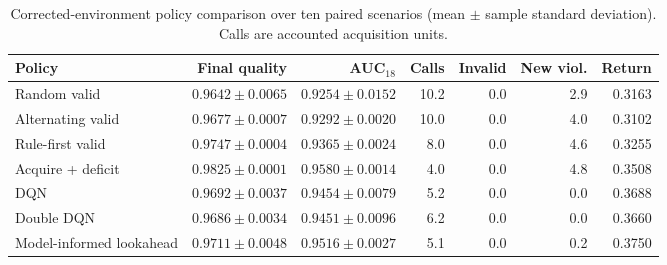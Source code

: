 \begin{table}[t]
\centering
\caption{Corrected-environment policy comparison over ten paired scenarios (mean $\pm$ sample standard deviation). Calls are accounted acquisition units.}
\label{tab:rl_ablation}
\footnotesize
\setlength{\tabcolsep}{3pt}
\begin{tabular*}{\textwidth}{@{\extracolsep{\fill}}lrrrrrr@{}}
\toprule
Policy & Final quality & AUC$_{18}$ & Calls & Invalid & New viol. & Return \\
\midrule
Random valid & $0.9642\pm0.0065$ & $0.9254\pm0.0152$ & 10.2 & 0.0 & 2.9 & 0.3163 \\
Alternating valid & $0.9677\pm0.0007$ & $0.9292\pm0.0020$ & 10.0 & 0.0 & 4.0 & 0.3102 \\
Rule-first valid & $0.9747\pm0.0004$ & $0.9365\pm0.0024$ & 8.0 & 0.0 & 4.6 & 0.3255 \\
Acquire + deficit & $0.9825\pm0.0001$ & $0.9580\pm0.0014$ & 4.0 & 0.0 & 4.8 & 0.3508 \\
DQN & $0.9692\pm0.0037$ & $0.9454\pm0.0079$ & 5.2 & 0.0 & 0.0 & 0.3688 \\
Double DQN & $0.9686\pm0.0034$ & $0.9451\pm0.0096$ & 6.2 & 0.0 & 0.0 & 0.3660 \\
Model-informed lookahead & $0.9711\pm0.0048$ & $0.9516\pm0.0027$ & 5.1 & 0.0 & 0.2 & 0.3750 \\
\bottomrule
\end{tabular*}
\end{table}
